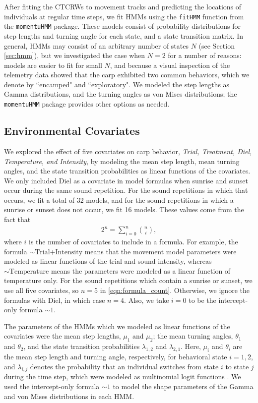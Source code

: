 \documentclass[12pt]{article}
\begin{document}
	After fitting the CTCRWs to movement tracks and predicting the locations of individuals at regular time steps, we fit HMMs using the \texttt{fitHMM} function from the \texttt{momentuHMM} package. These models consist of probability distributions for step lengths and turning angle for each state, and a state transition matrix. In general, HMMs may consist of an arbitrary number of states $N$ (see Section \ref{sec:hmm}), but we investigated the case when $N = 2$ for a number of reasons: models are easier to fit for small $N$, and because a visual inspection of the telemetry data showed that the carp exhibited two common behaviors, which we denote by ``encamped" and ``exploratory". We modeled the step lengths as Gamma distributions, and the turning angles as von Mises distributions; the \texttt{momentuHMM} package provides other options as needed.
	
	\subsection{Environmental Covariates}
	
	We explored the effect of five covariates on carp behavior, \emph{Trial, Treatment, Diel, Temperature, and Intensity}, by modeling the mean step length, mean turning angles, and the state transition probabilities as linear functions of the covariates.	We only included Diel as a covariate in model formulas when sunrise and sunset occur during the same sound repetition. For the sound repetitions in which that occurs, we fit a total of 32 models, and for the sound repetitions in which a sunrise or sunset does not occur, we fit 16 models. These values come from the fact that
	\begin{align}
		2^n = \sum_{i=0}^n {n \choose i}, \label{eqn:formula_count}
	\end{align}
	where $i$ is the number of covariates to include in a formula. For example, the formula $\sim \! \text{Trial+Intensity}$ means that the movement model parameters were modeled as linear functions of the trial and sound intensity, whereas $\sim \! \text{Temperature}$ means the parameters were modeled as a linear function of temperature only. For the sound repetitions which contain a sunrise or sunset, we use all five covariates, so $n = 5$ in \eqref{eqn:formula_count}. Otherwise, we ignore the formulas with Diel, in which case $n = 4$. Also, we take $i = 0$ to be the intercept-only formula $\sim \! 1$.
	
	The parameters of the HMMs which we modeled as linear functions of the covariates were the mean step lengths, $\mu_1$ and $\mu_2$; the mean turning angles, $\theta_1$ and $\theta_2$, and the state transition probabilities $\lambda_{1,2}$ and $\lambda_{2, 1}$. Here, $\mu_i$ and $\theta_i$ are the mean step length and turning angle, respectively, for behavioral state $i = 1, 2$, and $\lambda_{i, j}$ denotes the probability that an individual switches from state $i$ to state $j$ during the time step, which were modeled as multinomial logit functions \cite{Michelot2016}. We used the intercept-only formula $\sim \! 1$ to model the shape parameters of the Gamma and von Mises distributions in each HMM.
	
\end{document}
